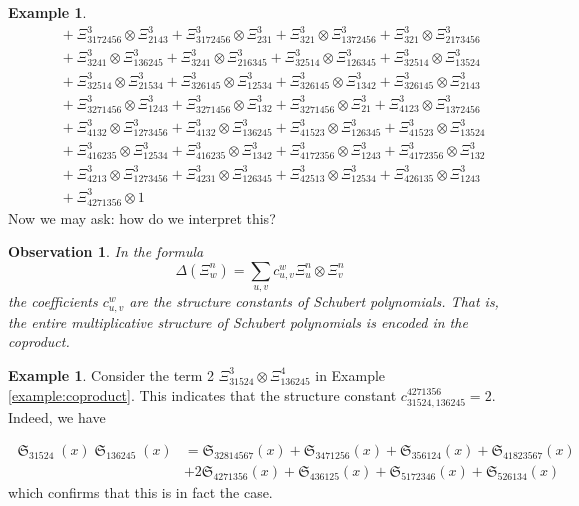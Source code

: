 \documentclass{amsart}
\newtheorem{observation}{Observation}[section]
\theoremstyle{definition}
\newtheorem{example}[lemma]{Example}
\theoremstyle{remark}
\numberwithin{equation}{subsection}
\DeclareMathOperator{\sch}{\mathfrak{S}}
\newcommand{\dsch}{\ensuremath{\Xi}}
\begin{document}
\begin{example}
\begin{align*}
&\quad + \Xi_{3172456}^{3} \otimes \Xi_{2143}^{3} + \Xi_{3172456}^{3} \otimes \Xi_{231}^{3} + \Xi_{321}^{3} \otimes \Xi_{1372456}^{3} + \Xi_{321}^{3} \otimes \Xi_{2173456}^{3} \\
&\quad + \Xi_{3241}^{3} \otimes \Xi_{136245}^{3} + \Xi_{3241}^{3} \otimes \Xi_{216345}^{3} + \Xi_{32514}^{3} \otimes \Xi_{126345}^{3} + \Xi_{32514}^{3} \otimes \Xi_{13524}^{3} \\
&\quad + \Xi_{32514}^{3} \otimes \Xi_{21534}^{3} + \Xi_{326145}^{3} \otimes \Xi_{12534}^{3} + \Xi_{326145}^{3} \otimes \Xi_{1342}^{3} + \Xi_{326145}^{3} \otimes \Xi_{2143}^{3} \\
&\quad + \Xi_{3271456}^{3} \otimes \Xi_{1243}^{3} + \Xi_{3271456}^{3} \otimes \Xi_{132}^{3} + \Xi_{3271456}^{3} \otimes \Xi_{21}^{3} + \Xi_{4123}^{3} \otimes \Xi_{1372456}^{3} \\
&\quad + \Xi_{4132}^{3} \otimes \Xi_{1273456}^{3} + \Xi_{4132}^{3} \otimes \Xi_{136245}^{3} + \Xi_{41523}^{3} \otimes \Xi_{126345}^{3} + \Xi_{41523}^{3} \otimes \Xi_{13524}^{3} \\
&\quad + \Xi_{416235}^{3} \otimes \Xi_{12534}^{3} + \Xi_{416235}^{3} \otimes \Xi_{1342}^{3} + \Xi_{4172356}^{3} \otimes \Xi_{1243}^{3} + \Xi_{4172356}^{3} \otimes \Xi_{132}^{3} \\
&\quad + \Xi_{4213}^{3} \otimes \Xi_{1273456}^{3} + \Xi_{4231}^{3} \otimes \Xi_{126345}^{3} + \Xi_{42513}^{3} \otimes \Xi_{12534}^{3} + \Xi_{426135}^{3} \otimes \Xi_{1243}^{3} \\
&\quad + \Xi_{4271356}^{3} \otimes 1
\end{align*}
Now we may ask: how do we interpret this?
\end{example}

\begin{observation}
In the formula
$$\Delta(\dsch_w^n) = \sum_{u,v} c_{u,v}^w\dsch_u^n\otimes \dsch_v^n$$
the coefficients $c_{u,v}^w$ are the structure constants of Schubert polynomials. That is, the entire multiplicative structure of Schubert polynomials is encoded in the coproduct.
\end{observation}

\begin{example}
Consider the term 2 $\Xi_{31524}^{3} \otimes \Xi_{136245}^{4}$ in Example \ref{example:coproduct}. This indicates that the structure constant $c_{31524,136245}^{4271356}=2$. Indeed, we have

\begin{align*}
\sch_{31524}(x)\sch_{136245}(x)&=\mathfrak{S}_{3  2  8  1  4  5  6  7}{\left(x \right)} + \mathfrak{S}_{3  4  7  1  2  5  6}{\left(x \right)} + \mathfrak{S}_{3  5  6  1  2  4}{\left(x \right)} + \mathfrak{S}_{4  1  8  2  3  5  6  7}{\left(x \right)} \\
&+ 2 \mathfrak{S}_{4  2  7  1  3  5  6}{\left(x \right)} + \mathfrak{S}_{4  3  6  1  2  5}{\left(x \right)} + \mathfrak{S}_{5  1  7  2  3  4  6}{\left(x \right)}+ \mathfrak{S}_{5  2  6  1  3  4}{\left(x \right)}
\end{align*}
which confirms that this is in fact the case.
\end{example}
\end{document}
